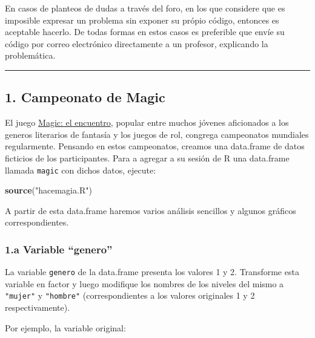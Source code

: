 \documentclass[]{article}
\newenvironment{Shaded}{}{}
\newcommand{\KeywordTok}[1]{\textcolor[rgb]{0.00,0.44,0.13}{\textbf{{#1}}}}
\newcommand{\DecValTok}[1]{\textcolor[rgb]{0.25,0.63,0.44}{{#1}}}
\newcommand{\StringTok}[1]{\textcolor[rgb]{0.25,0.44,0.63}{{#1}}}
\newcommand{\NormalTok}[1]{{#1}}
\begin{document}
En casos de planteos de dudas a través del foro, en los que considere
que es imposible expresar un problema sin exponer su própio código,
entonces es aceptable hacerlo. De todas formas en estos casos es
preferible que envíe su código por correo electrónico directamente a un
profesor, explicando la problemática.

\begin{center}\rule{3in}{0.4pt}\end{center}

\subsection{1. Campeonato de Magic}

El juego
\href{https://es.wikipedia.org/wiki/Magic:\_el\_encuentro}{Magic: el
encuentro}, popular entre muchos jóvenes aficionados a los generos
literarios de fantasía y los juegos de rol, congrega campeonatos
mundiales regularmente. Pensando en estos campeonatos, creamos una
data.frame de datos ficticios de los participantes. Para a agregar a su
sesión de R una data.frame llamada \texttt{magic} con dichos datos,
ejecute:

\begin{Shaded}
\begin{Highlighting}[]
\KeywordTok{source}\NormalTok{(}\StringTok{"hacemagia.R"}\NormalTok{)}
\end{Highlighting}
\end{Shaded}

A partir de esta data.frame haremos varios análisis sencillos y algunos
gráficos correspondientes.

\subsubsection{1.a Variable ``genero''}

La variable \texttt{genero} de la data.frame presenta los valores 1 y 2.
Transforme esta variable en factor y luego modifique los nombres de los
niveles del mismo a \texttt{"mujer"} y \texttt{"hombre"}
(correspondientes a los valores originales 1 y 2 respectivamente).

Por ejemplo, la variable original:

\begin{Shaded}
\end{Shaded}
\end{document}
